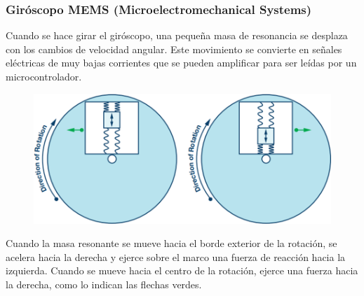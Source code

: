 \begin{frame}
    \frametitle{Giróscopo MEMS (Microelectromechanical Systems)}
    \footnotesize

    Cuando se hace girar el giróscopo, una pequeña masa de resonancia se desplaza con los cambios de velocidad angular. Este movimiento se convierte en señales eléctricas de muy bajas corrientes que se pueden amplificar para ser leídas por un microcontrolador.

    \begin{figure}[!h]
        \centering
        \includegraphics[width=0.4\columnwidth]{images/gyroscope_mems_2.png}
    \end{figure}

    Cuando la masa resonante se mueve hacia el borde exterior de la rotación, se acelera hacia la derecha y ejerce sobre el marco una fuerza de reacción hacia la izquierda. Cuando se mueve hacia el centro de la rotación, ejerce una fuerza hacia la derecha, como lo indican las flechas verdes.
\end{frame}

